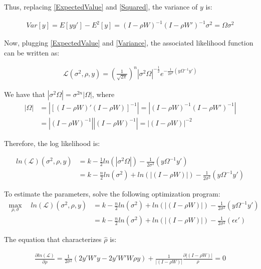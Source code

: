 \documentclass[12pt]{article}
\begin{document}
\begin{enumerate}
\begin{enumerate}
\begin{enumerate}
      Thus, replacing \eqref{ExpectedValue} and \eqref{Squared}, the variance of $y$ is:
      
      \begin{align}
          Var[y]= E[yy'] - E^2[y] = (I-\rho W)^{-1} (I-\rho W')^{-1} \sigma^2 = \Omega \sigma^2 \label{Variance}
      \end{align}

     Now, plugging \eqref{ExpectedValue} and \eqref{Variance}, the associated likelihood function can be written as: 
     
     \begin{align*}
     \mathcal{L} (\sigma^2, \rho, y) = \left( \frac{1}{\sqrt{2 \pi}}\right)^n |\sigma^2 \Omega|^{-\frac{1}{2}} e^{-\frac{1}{2\sigma^2} (y \Omega^{-1} y')}
     \end{align*}
     
     We have that $|\sigma^2 \Omega| = \sigma^{2n} |\Omega|$, where
     \begin{align*}
         |\Omega| &= |[(I-\rho W)'(I-\rho W)]^{-1}| = |(I-\rho W)^{-1}(I-\rho W')^{-1}|\\
         &= |(I-\rho W)^{-1}| |(I-\rho W)^{-1}| = |(I-\rho W)|^{-2}
     \end{align*}
      
      Therefore, the log likelihood is:
      
      \begin{align*}
     ln(\mathcal{L}) (\sigma^2, \rho, y) &= k - \frac{1}{2} ln(|\sigma^2 \Omega|) - \frac{1}{2 \sigma^2} (y \Omega^{-1} y')\\
     &= k - \frac{n}{2} ln(\sigma^2) + ln(|(I-\rho W)|) - \frac{1}{2 \sigma^2} (y \Omega^{-1} y')
     \end{align*}
     
     To estimate the parameters, solve the following optimization program:
      \begin{align*}
          \max_{\rho, \sigma} \quad ln(\mathcal{L}) (\sigma^2, \rho, y) &= k - \frac{n}{2} ln(\sigma^2) + ln(|(I-\rho W)|) - \frac{1}{2 \sigma^2} (y \Omega^{-1} y')\\
          &= k - \frac{n}{2} ln(\sigma^2) + ln(|(I-\rho W)|) - \frac{1}{2 \sigma^2} (\epsilon \epsilon')
      \end{align*}
     
     The equation that characterizes $\hat{\rho}$ is:
     
     \begin{align*}
         \frac{\partial ln(\mathcal{L})}{\partial \rho} = \frac{1}{2\sigma^2} \left(2y'W'y - 2 y'W'W \rho y\right) + \frac{1}{|(I-\rho W)|} \frac{\partial |(I-\rho W)|}{\rho}  = 0
     \end{align*}
     

\end{enumerate}
\end{enumerate}
\end{enumerate}
\end{document}
